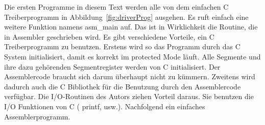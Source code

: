Die ersten Programme in diesem Text werden alle von dem einfachen C
Treiberprogramm in Abbildung~\ref{fig:driverProg} ausgehen. Es ruft
einfach eine weitere Funktion namens {\code asm\_main} auf. Das ist
in Wirklichkeit die Routine, die in Assembler geschrieben wird. Es
gibt verschiedene Vorteile, ein C Treiberprogramm zu benutzen.
Erstens wird so das Programm durch das C System initialisiert, damit
es korrekt im protected Mode l\"{a}uft. Alle Segmente und ihre dazu
geh\"{o}renden Segmentregister werden von C initialisiert. Der
Assemblercode braucht sich darum \"{u}berhaupt nicht zu k\"{u}mmern.
Zweitens wird dadurch auch die C Bibliothek f\"{u}r die Benutzung durch
den Assemblercode verf\"{u}gbar. Die I/O-Routinen des Autors ziehen
Vorteil daraus. Sie benutzen die I/O Funktionen von C ({\code
printf},  usw.). Nachfolgend ein einfaches
Assemblerprogramm.

